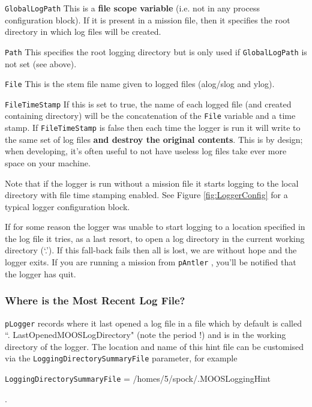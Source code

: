 \documentclass[a4paper,10pt]{article}
\newcommand{\Code}[1]{\texttt{#1} }
\newcommand{\code}[1]{\Code{#1} }
\begin{document}
\begin{description}
\item{\code{GlobalLogPath}} This is a {\textbf{file scope variable}} (i.e. not in any process configuration block). If it is present in a mission file, then it specifies the root directory in which log files will be created.
\item{\code{Path}} This specifies the root logging directory but is only used if \code{GlobalLogPath} is not set (see above).
\item{\code{File}} This is the stem file name given to logged files (alog/slog and ylog).
\item{\code{FileTimeStamp}} If this is set to true, the name of  each logged file (and created containing directory) will be the concatenation of the \code{File} variable and a time stamp. If \code{FileTimeStamp} is false then each time the logger is run it will write to the same set of log files {\textbf{and destroy the original contents}}. This is by design; when developing, it's often useful to not have useless log files take ever more space on your machine.
\end{description}

Note that if the logger is run without a mission file it starts logging to the local directory with file time stamping enabled. See Figure \ref{fig:LoggerConfig} for a typical logger configuration block.

If for some reason the logger was unable to start logging to a location specified in the log file it tries, as a last resort, to open a log directory in the current working directory (`.'). If this fall-back fails then all is lost, we are without hope and the logger exits. If you are running a mission from \code{pAntler}, you'll be notified that the logger has quit.


\subsubsection{Where is the Most Recent Log File?}


\code{pLogger} records where it last opened a log file in a file which by default is called ``. LastOpenedMOOSLogDirectory" (note the period !) and is in the working directory of the logger. The location and name of this hint file can be customised via the \code{LoggingDirectorySummaryFile} parameter, for example

\begin{center}
\code{LoggingDirectorySummaryFile} =  /homes/5/spock/.MOOSLoggingHint
\end{center}.
\end{document}
